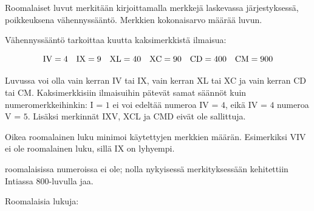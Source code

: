 Roomalaiset luvut merkitään kirjoittamalla merkkejä laskevassa järjestyksessä, poikkeuksena vähennyssääntö. Merkkien kokonaisarvo määrää luvun.

Vähennyssääntö tarkoittaa kuutta kaksimerkkistä ilmaisua:

\begin{equation*}
	\rm IV=4\quad
	IX=9\quad
	XL=40\quad
	XC=90\quad
	CD=400\quad
	CM=900
\end{equation*}

Luvussa voi olla vain kerran IV tai IX, vain kerran XL tai XC ja vain kerran CD tai CM.
Kaksimerkkisiin ilmaisuihin pätevät samat säännöt kuin numeromerkkeihinkin: I = $1$ ei voi edeltää numeroa IV = $4$, eikä IV = $4$ numeroa V = $5$.
Lisäksi merkinnät IXV, XCL ja CMD eivät ole sallittuja.

Oikea roomalainen luku minimoi käytettyjen merkkien määrän. Esimerkiksi VIV ei ole roomalainen luku, sillä IX on lyhyempi.

 roomalaisissa numeroissa ei ole; nolla nykyisessä merkityksessään kehitettiin Intiassa 800-luvulla jaa.

\begin{esimerkki}
	Roomalaisia lukuja:
	\begin{alakohdat}
	\end{alakohdat}
\end{esimerkki}

